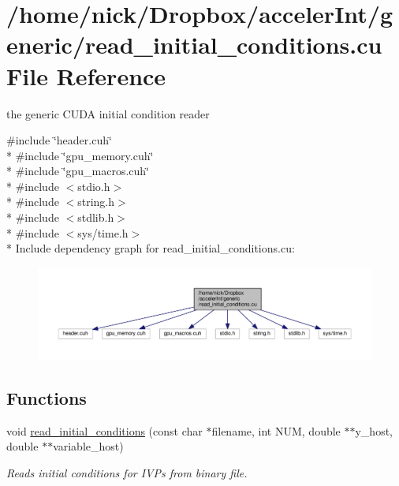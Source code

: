 \hypertarget{read__initial__conditions_8cu}{}\section{/home/nick/\+Dropbox/acceler\+Int/generic/read\+\_\+initial\+\_\+conditions.cu File Reference}
\label{read__initial__conditions_8cu}


the generic C\+U\+DA initial condition reader  


{\ttfamily \#include \char`\"{}header.\+cuh\char`\"{}}\\*
{\ttfamily \#include \char`\"{}gpu\+\_\+memory.\+cuh\char`\"{}}\\*
{\ttfamily \#include \char`\"{}gpu\+\_\+macros.\+cuh\char`\"{}}\\*
{\ttfamily \#include $<$stdio.\+h$>$}\\*
{\ttfamily \#include $<$string.\+h$>$}\\*
{\ttfamily \#include $<$stdlib.\+h$>$}\\*
{\ttfamily \#include $<$sys/time.\+h$>$}\\*
Include dependency graph for read\+\_\+initial\+\_\+conditions.\+cu\+:
\nopagebreak
\begin{figure}[H]
\begin{center}
\leavevmode
\includegraphics[width=350pt]{read__initial__conditions_8cu__incl}
\end{center}
\end{figure}
\subsection*{Functions}
\begin{DoxyCompactItemize}
\item 
void \hyperlink{read__initial__conditions_8cu_a79be377a219a9ab2ae5c3a313b33afed}{read\+\_\+initial\+\_\+conditions} (const char $\ast$filename, int N\+UM, double $\ast$$\ast$y\+\_\+host, double $\ast$$\ast$variable\+\_\+host)
\begin{DoxyCompactList}\small\item\em Reads initial conditions for I\+V\+Ps from binary file. \end{DoxyCompactList}\end{DoxyCompactItemize}



